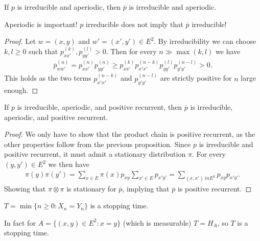 \begin{prop}[]
	If $p$ is irreducible and aperiodic, then $\overline{p}$ is irreducible and aperiodic.
\end{prop}

\begin{rmk}[]
	Aperiodic is important!  $p$ irreducible does not imply that $\overline{p}$ irreducible!
\end{rmk}
\begin{proof}
	Let $w=(x,y)$ and $w'=(x',y') \in E^2$. By irreducibility we can choose $k,l\geq 0$ such that $p_{xx'}^{(k)}, p_{yy'}^{(l)} >0$. Then for every $n \gg \max(k,l)$ we have
\begin{align}
	\overline{p}_{ww'}^{(n)} = p_{xx'}^{(n)}p_{yy'}^{(n)} \geq p_{xx'}^{(k)}p_{x'x'}^{(n-k)} p_{yy'}^{(l)} p_{y'y'}^{(n-l)} > 0.
\end{align}
This holds as the two terms $p_{x'x'}^{(n-k)}$ and $p_{y'y'}^{(n-l)}$ are strictly positive for $n$ large enough.
\end{proof}

\begin{prop}[]
	If $p$ is irreducible, aperiodic, and positive recurrent, then $\overline{p}$ is irreducible, aperiodic, and positive recurrent.
\end{prop}
\begin{proof}
	We only have to show that the product chain is positive recurrent, as the other properties follow from the previous proposition. Since $p$ is irreducible and positive recurrent, it must admit a stationary distribution $\pi $. For every $(y,y')\in E^2$ we then have
\begin{align}
	\pi (y) \pi (y') = \sum_{x \in E}^{} \pi(x)p_{xy} \sum_{x' \in E}^{}p_{x'y'} = \sum_{(x,x')\ in E^2}^{} p_{xy}p_{x'y'}. 
\end{align}
Showing that $\pi \otimes \pi $ is stationary for $\overline{p}$, implying that $\overline{p}$ is positive recurrent.

\end{proof}


\begin{defn}
	$T=\min\{n\geq 0: X_n=Y_n\}$ is a stopping time.
\end{defn}
\begin{rmk}[]
	In fact for $A = \{ (x,y) \in E^2: x=y\}$ (which is measurable) $T=H_A$, so $T$ is a stopping time.
\end{rmk}


